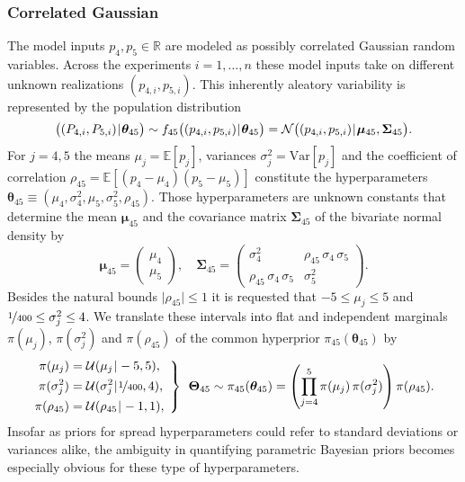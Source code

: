 \subsubsection{Correlated Gaussian}
The model inputs \(p_4,p_5 \in \mathds{R}\) are modeled as possibly correlated Gaussian random variables.
Across the experiments \(i=1,\ldots,n\) these model inputs take on different unknown realizations \((p_{4,i},p_{5,i})\).
This inherently aleatory variability is represented by the population distribution
\begin{equation} \label{eq:JAIS:Distr:p45}
  \big( (P_{4,i},P_{5,i}) {\:\!}|{\:\!} \bm{\theta}_{45} \big) \sim f_{45} \big( (p_{4,i},p_{5,i}) {\:\!}|{\:\!} \bm{\theta}_{45} \big) = \mathcal{N} \big( (p_{4,i},p_{5,i}) {\:\!}|{\:\!} \bm{\mu}_{45},\bm{\Sigma}_{45} \big).
\end{equation}
For \(j=4,5\) the means \(\mu_j = \mathds{E}[p_j]\), variances \(\sigma_j^2 = \mathrm{Var}[p_j]\) and the coefficient of correlation
\(\rho_{45} = \mathds{E}[(p_4-\mu_4)(p_5-\mu_5)]\) constitute the hyperparameters \(\bm{\theta}_{45} \equiv (\mu_4,\sigma^2_4,\mu_5,\sigma^2_5,\rho_{45})\).
Those hyperparameters are unknown constants that determine the mean \(\bm{\mu}_{45}\) and the covariance matrix \(\bm{\Sigma}_{45}\) of the bivariate normal density by
\begin{equation}
  \bm{\mu}_{45} = \begin{pmatrix}
                    \mu_4 \\
                    \mu_5
                  \end{pmatrix},
  \quad
  \bm{\Sigma}_{45} = \begin{pmatrix}
                       \sigma_4^2 & \rho_{45} \, \sigma_4 \, \sigma_5 \\
                       \rho_{45} \, \sigma_4 \, \sigma_5 & \sigma_5^2
                     \end{pmatrix}.
\end{equation}
Besides the natural bounds \(\lvert \rho_{45} \rvert \leq 1\) it is requested that \(-5 \leq \mu_j \leq 5\) and \(\nicefrac{1}{400} \leq \sigma_j^2 \leq 4\).
We translate these intervals into flat and independent marginals \(\pi(\mu_j)\), \(\pi(\sigma^2_j)\) and \(\pi(\rho_{45})\) of the common hyperprior \(\pi_{45}(\bm{\theta}_{45})\) by
\begin{equation} \label{eq:JAIS:Prior:Hyper:p45}
  \left.
  \begin{aligned}
    \pi(\mu_j)      &= \mathcal{U}(\mu_j {\:\!}|{\:\!} -5,5), \\
    \pi(\sigma^2_j) &= \mathcal{U}(\sigma^2_j {\:\!}|{\:\!} \nicefrac{1}{400},4), \\
    \pi(\rho_{45})  &= \mathcal{U}(\rho_{45} {\:\!}|{\:\!} -1,1),
  \end{aligned}
  \;\, \right\} \;\, \bm{\Theta}_{45} \sim \pi_{45}(\bm{\theta}_{45}) = \left( \prod\limits_{j=4}^5 \pi(\mu_j) \, \pi(\sigma^2_j) \right) \pi(\rho_{45}).
\end{equation}
Insofar as priors for spread hyperparameters could refer to standard deviations or variances alike,
the ambiguity in quantifying parametric Bayesian priors becomes especially obvious for these type of hyperparameters.

